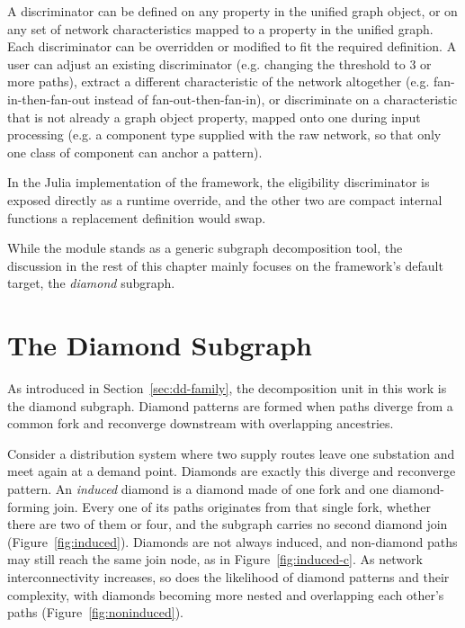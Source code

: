 \documentclass[12pt]{report}
\begin{document}
A discriminator can be defined on any property in the unified graph object, or on any set of network characteristics mapped to a property in the unified graph. Each discriminator can be overridden or modified to fit the required definition. A user can adjust an existing discriminator (e.g. changing the threshold to 3 or more paths), extract a different characteristic of the network altogether (e.g. fan-in-then-fan-out instead of fan-out-then-fan-in), or discriminate on a characteristic that is not already a graph object property, mapped onto one during input processing (e.g. a component type supplied with the raw network, so that only one class of component can anchor a pattern).

In the Julia implementation of the framework,  the eligibility discriminator is exposed directly as a runtime override, and the other two are compact internal functions a replacement definition would swap.

While the module stands as a generic subgraph decomposition tool, the discussion in the rest of this chapter mainly focuses on the framework's default target, the \textit{diamond} subgraph.

\section{The Diamond Subgraph}
\label{sec:dd-diamond}

As introduced in Section~\ref{sec:dd-family}, the decomposition unit in this work is the diamond subgraph. Diamond patterns are formed when paths diverge from a common fork and reconverge downstream with overlapping ancestries.

Consider a distribution system where two supply routes leave one substation and meet again at a demand point. Diamonds are exactly this diverge and reconverge pattern. An \emph{induced} diamond is a diamond made of one fork and one diamond-forming join. Every one of its paths originates from that single fork, whether there are two of them or four, and the subgraph carries no second diamond join (Figure~\ref{fig:induced}). Diamonds are not always induced, and non-diamond paths may still reach the same join node, as in Figure~\ref{fig:induced-c}. As network interconnectivity increases, so does the likelihood of diamond patterns and their complexity, with diamonds becoming more nested and overlapping each other's paths (Figure~\ref{fig:noninduced}).
\end{document}
